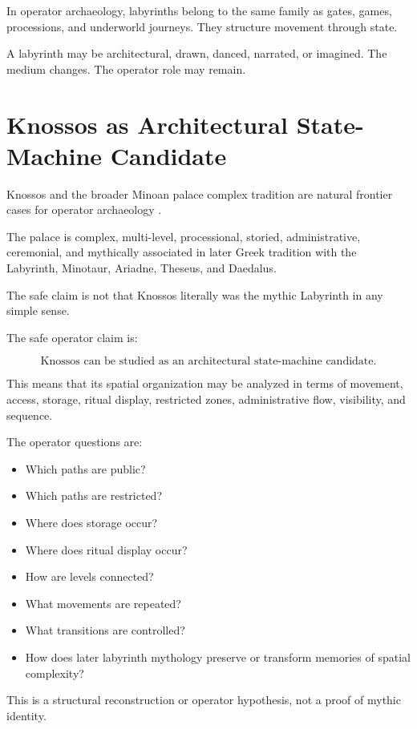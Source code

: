 \documentclass[11pt]{book}
\begin{document}
In operator archaeology, labyrinths belong to the same family as gates, games, processions, and underworld journeys. They structure movement through state.

A labyrinth may be architectural, drawn, danced, narrated, or imagined. The medium changes. The operator role may remain.

\section{Knossos as Architectural State-Machine Candidate}

Knossos and the broader Minoan palace complex tradition are natural frontier cases for operator archaeology \cite{Evans1921PalaceMinos1,PreziosiHitchcock1999AegeanArtArchitecture}.

The palace is complex, multi-level, processional, storied, administrative, ceremonial, and mythically associated in later Greek tradition with the Labyrinth, Minotaur, Ariadne, Theseus, and Daedalus.

The safe claim is not that Knossos literally was the mythic Labyrinth in any simple sense.

The safe operator claim is:

\[
\text{Knossos can be studied as an architectural state-machine candidate}.
\]

This means that its spatial organization may be analyzed in terms of movement, access, storage, ritual display, restricted zones, administrative flow, visibility, and sequence.

The operator questions are:

\begin{itemize}
    \item Which paths are public?
    \item Which paths are restricted?
    \item Where does storage occur?
    \item Where does ritual display occur?
    \item How are levels connected?
    \item What movements are repeated?
    \item What transitions are controlled?
    \item How does later labyrinth mythology preserve or transform memories of spatial complexity?
\end{itemize}

This is a structural reconstruction or operator hypothesis, not a proof of mythic identity.
\end{document}
